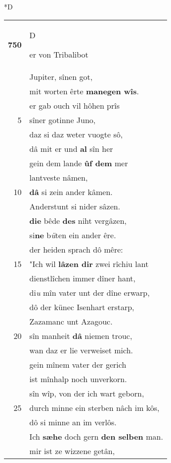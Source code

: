 \documentclass[8pt,a4paper,notitlepage]{article}
\begin{document}
\begin{table}[ht]
\begin{minipage}[t]{0.5\linewidth}
\small
\begin{center}*D
\end{center}
\begin{tabular}{rl}
\textbf{750} & \begin{large}D\end{large}er von Tribalibot\\ 
 & Jupiter, sînen got,\\ 
 & mit worten êrte \textbf{manegen wîs}.\\ 
 & er gab ouch vil hôhen prîs\\ 
5 & sîner gotinne Juno,\\ 
 & daz si daz weter vuogte sô,\\ 
 & dâ mit er und \textbf{al} sîn her\\ 
 & gein dem lande \textbf{ûf dem} mer\\ 
 & lantveste nâmen,\\ 
10 & \textbf{dâ} si zein ander kâmen.\\ 
 & Anderstunt si nider sâzen.\\ 
 & \textbf{die} bêde \textbf{des} niht vergâzen,\\ 
 & si\textbf{ne} b\textit{ü}ten ein ander êre.\\ 
 & der heiden sprach dô mêre:\\ 
15 & "Ich wil \textbf{lâzen dir} zwei rîchiu lant\\ 
 & dienstlîchen immer dîner hant,\\ 
 & di\textit{u} mîn vater unt der dîne erwarp,\\ 
 & dô der künec Isenhart erstarp,\\ 
 & Zazamanc unt Azagouc.\\ 
20 & sîn manheit \textbf{dâ} niemen trouc,\\ 
 & wan daz er lie verweiset mich.\\ 
 & gein mînem vater der gerich\\ 
 & ist mînhalp noch unverkorn.\\ 
 & sîn wîp, von der ich wart geborn,\\ 
25 & durch minne ein sterben nâch im kôs,\\ 
 & dô si minne an im verlôs.\\ 
 & Ich \textbf{sæhe} doch gern \textbf{den selben} man.\\ 
 & mir ist ze wizzene getân,\\ 

\end{tabular}
\end{minipage}
\end{table}
\end{document}
